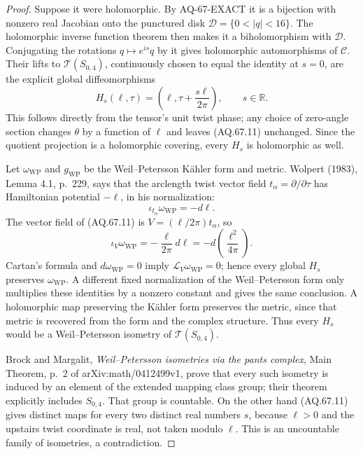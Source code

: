 \begin{proof}
Suppose it were holomorphic. By AQ-67-EXACT it is a bijection
with nonzero real Jacobian onto the punctured disk
$\mathcal D=\{0<|q|<16\}$. The holomorphic inverse function
theorem then makes it a biholomorphism with $\mathcal D$.
Conjugating the rotations $q\mapsto e^{is}q$ by it gives
holomorphic automorphisms of $\mathcal C$. Their lifts to
$\mathcal T(S_{0,4})$, continuously chosen to equal the identity
at $s=0$, are the explicit global diffeomorphisms
\[
 H_s(\ell,\tau)=
       \left(\ell,\tau+\frac{s\ell}{2\pi}\right),
                      \qquad s\in\mathbb R.                  \tag{AQ.67.11}
\]
This follows directly from the tensor's unit twist phase;
any choice of zero-angle section changes $\theta$ by a function
of $\ell$ and leaves (AQ.67.11) unchanged. Since the quotient
projection is a holomorphic covering, every $H_s$ is
holomorphic as well.

Let $\omega_{\mathrm{WP}}$ and $g_{\mathrm{WP}}$ be the
Weil--Petersson K\"ahler form and metric. Wolpert (1983),
Lemma 4.1, p.~229, says that the arclength twist vector field
$t_\alpha=\partial/\partial\tau$ has Hamiltonian potential
$-\ell$, in his normalization:
\[
 \iota_{t_\alpha}\omega_{\mathrm{WP}}=-d\ell.
\]
The vector field of (AQ.67.11) is
$V=(\ell/2\pi)t_\alpha$, so
\[
 \iota_V\omega_{\mathrm{WP}}
   =-\frac{\ell}{2\pi}d\ell
   =-d\!\left(\frac{\ell^2}{4\pi}\right).
\]
Cartan's formula and $d\omega_{\mathrm{WP}}=0$ imply
$\mathcal L_V\omega_{\mathrm{WP}}=0$; hence every global
$H_s$ preserves $\omega_{\mathrm{WP}}$. A different fixed
normalization of the Weil--Petersson form only multiplies
these identities by a nonzero constant and gives the same
conclusion. A holomorphic map preserving the K\"ahler form
preserves the metric, since that metric is recovered from
the form and the complex structure. Thus every $H_s$ would
be a Weil--Petersson isometry of $\mathcal T(S_{0,4})$.

Brock and Margalit, \emph{Weil--Petersson isometries via the
pants complex}, Main Theorem, p.~2 of arXiv:math/0412499v1,
prove that every such isometry is induced by an element of
the extended mapping class group; their theorem explicitly
includes $S_{0,4}$. That group is countable. On the other
hand (AQ.67.11) gives distinct maps for every two distinct
real numbers $s$, because $\ell>0$ and the upstairs twist
coordinate is real, not taken modulo $\ell$. This is an
uncountable family of isometries, a contradiction.
\end{proof}

